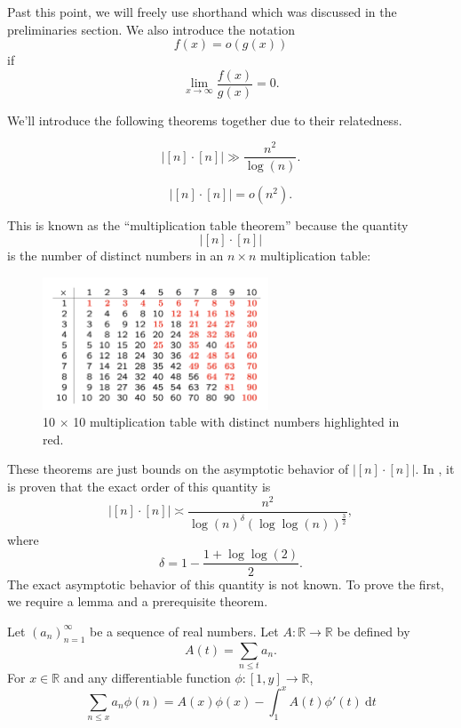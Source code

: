 \documentclass[12pt,reqno]{amsart}
\begin{document}
Past this point, we will freely use shorthand which was discussed in the preliminaries
section. We also introduce the notation
\[
    f(x) = o(g(x))
\]
if
\[
    \lim_{x \to \infty} \frac{f(x)}{g(x)} = 0 
.\]

We'll introduce the following theorems together due to their relatedness.

\begin{theorem*}
\[
    \left\lvert [n] \cdot [n] \right\rvert \gg \frac{n ^{2}}{\log \left( n \right) }    
.\]
\end{theorem*}

\begin{theorem*}
\[
    \left\lvert [n] \cdot [n] \right\rvert = o(n^{2})
.\]
\end{theorem*}

This is known as the ``multiplication table theorem'' because the quantity
\[
    \left\lvert [n] \cdot [n] \right\rvert 
\]
is the number of distinct numbers in an \(n \times n\) multiplication table:

\begin{figure}[h]
    \centering
    \includegraphics[width=0.6\textwidth]{mult-table.png}
    \caption{10 \(\times \) 10 multiplication table with distinct numbers highlighted in red.}
\end{figure}

These theorems are just bounds on the asymptotic behavior of \(\left\lvert [n] \cdot [n] \right\rvert \). 
In \cite{Ford}, it is proven that the exact order of this quantity is
\[
    \left\lvert [n] \cdot [n] \right\rvert \asymp \frac{n^{2}}{\log \left( n \right) ^{\delta} \left( \log \log \left( n \right) \right) ^{\frac{3}{2} } } 
,\]
where
\[
    \delta = 1 - \frac{1 + \log \log \left( 2 \right)  }{2} 
.\]
The exact asymptotic behavior of this quantity is not known.
To prove the first, we require a lemma and a prerequisite theorem.

\begin{lemma*}
Let \(\left( a_{n}  \right) _{n = 1} ^{\infty }\) be a sequence of real numbers. Let \(A: \mathbb{R} \to \mathbb{R} \) be defined by
\[
    A(t) = \sum _{n \leq t} a_{n} 
.\]
For \(x \in \mathbb{R} \) and any differentiable function \(\phi : [1,y] \to \mathbb{R} \),
\[
    \sum _{n \leq x} a_{n} \phi(n) = A(x)\phi(x) - \int_{1}^{x} A(t)\phi'(t) ~\mathrm{d} t
\]
\end{lemma*}
\end{document}

